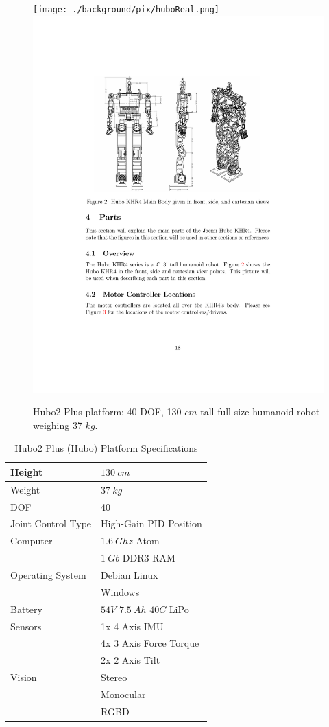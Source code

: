 \begin{figure}[thpb]
  \centering
\texttt{[image: ./background/pix/huboReal.png]}\includegraphics[width=0.63\columnwidth]{./pix/huboSkel.pdf}
  \caption{Hubo2 Plus platform: 40 DOF, 130 $cm$ tall full-size humanoid robot weighing 37 $kg$.}
  \label{fig:hubo}
\end{figure}


\begin{table}
\centering
\caption{Hubo2 Plus (Hubo) Platform Specifications}
\begin{tabular}{| l || l |}
\hline
Height      		& $130~cm$			\\
\hline
Weight			& $37~kg$			\\
\hline
DOF			& 40				\\
\hline
Joint Control Type	& High-Gain PID Position	\\
\hline
Computer		& $1.6~Ghz$ Atom		\\
			& $1~Gb$ DDR3 RAM		\\
\hline
Operating System	& Debian Linux			\\
			& Windows			\\
\hline
Battery			& $54V$ $7.5~Ah$ $40C$ LiPo	\\
\hline
Sensors			& 1x 4 Axis IMU			\\
			& 4x 3 Axis Force Torque	\\
			& 2x 2 Axis Tilt		\\
\hline
Vision			& Stereo			\\
			& Monocular			\\
			& RGBD				\\
\hline
\end{tabular}
\label{table:huboSensors}
\end{table}



